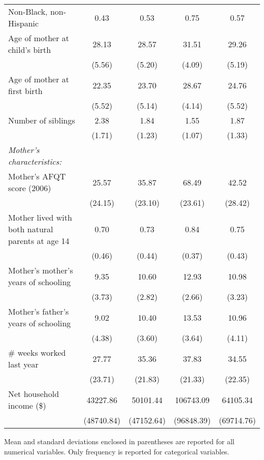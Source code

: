 \begin{table}[htbp]
\begin{threeparttable}
\begin{tabular}{l*{4}{c}}
		Non-Black, non-Hispanic&        0.43&        0.53&        0.75&        0.57\\
		
		Age of mother at child's birth&       28.13&       28.57&       31.51&       29.26\\
		&      (5.56)&      (5.20)&      (4.09)&      (5.19)\\
		
		Age of mother at first birth&       22.35&       23.70&       28.67&       24.76\\
		&      (5.52)&      (5.14)&      (4.14)&      (5.52)\\
		
		Number of siblings  &        2.38&        1.84&        1.55&        1.87\\
		&      (1.71)&      (1.23)&      (1.07)&      (1.33)\\
		
		\addlinespace
		\textit{Mother's characteristics:} & & & & \\
		\addlinespace
		Mother's AFQT score (2006)&       25.57&       35.87&       68.49&       42.52\\
		&     (24.15)&     (23.10)&     (23.61)&     (28.42)\\
		
		Mother lived with both natural parents at age 14&        0.70&        0.73&        0.84&        0.75\\
		&      (0.46)&      (0.44)&      (0.37)&      (0.43)\\
		
		Mother's mother's years of schooling&        9.35&       10.60&       12.93&       10.98\\
		&      (3.73)&      (2.82)&      (2.66)&      (3.23)\\
		
		Mother's father's years of schooling&        9.02&       10.40&       13.53&       10.96\\
		&      (4.38)&      (3.60)&      (3.64)&      (4.11)\\
		
		$\#$ weeks worked last year&       27.77&       35.36&       37.83&       34.55\\
		&     (23.71)&     (21.83)&     (21.33)&     (22.35)\\
		
		Net household income (\$)&    43227.86&    50101.44&   106743.09&    64105.34\\
		&  (48740.84)&  (47152.64)&  (96848.39)&  (69714.76)\\
		\bottomrule
	\end{tabular}
	\begin{tablenotes}[flushleft]
		\item Mean and standard deviations enclosed in parentheses are reported for all numerical variables. Only frequency is reported for categorical variables.
	\end{tablenotes}
\end{threeparttable}
\end{table}
